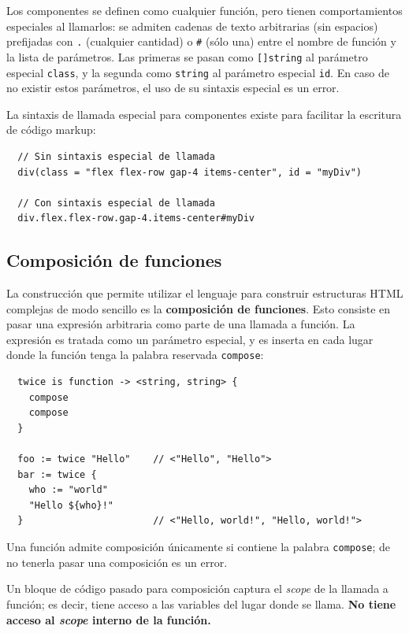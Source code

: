 Los componentes se definen como cualquier función, pero tienen comportamientos
especiales al llamarlos: se admiten cadenas de texto arbitrarias (sin espacios)
prefijadas con \texttt{.} (cualquier cantidad) o \texttt{\#} (sólo una) entre el
nombre de función y la lista de parámetros. Las primeras se pasan como
\texttt{[]string} al parámetro especial \texttt{class}, y la segunda como
\texttt{string} al parámetro especial \texttt{id}. En caso de no existir estos
parámetros, el uso de su sintaxis especial es un error.

La sintaxis de llamada especial para componentes existe para facilitar la
escritura de código markup:

\small
\begin{verbatim}
  // Sin sintaxis especial de llamada
  div(class = "flex flex-row gap-4 items-center", id = "myDiv")

  // Con sintaxis especial de llamada
  div.flex.flex-row.gap-4.items-center#myDiv
\end{verbatim}
\normalsize

\subsection{Composición de funciones}

La construcción que permite utilizar el lenguaje para construir estructuras
HTML complejas de modo sencillo es la \textbf{composición de funciones}. Esto
consiste en pasar una expresión arbitraria como parte de una llamada a función.
La expresión es tratada como un parámetro especial, y es inserta en cada
lugar donde la función tenga la palabra reservada \texttt{compose}:

\small
\begin{verbatim}
  twice is function -> <string, string> {
    compose
    compose
  }

  foo := twice "Hello"    // <"Hello", "Hello">
  bar := twice {
    who := "world"
    "Hello ${who}!"
  }                       // <"Hello, world!", "Hello, world!">
\end{verbatim}
\normalsize

Una función admite composición únicamente si contiene la palabra
\texttt{compose}; de no tenerla pasar una composición es un error.

Un bloque de código pasado para composición captura el \textit{scope} de la
llamada a función; es decir, tiene acceso a las variables del lugar donde se
llama. \textbf{No tiene acceso al \textit{scope} interno de la función.}

